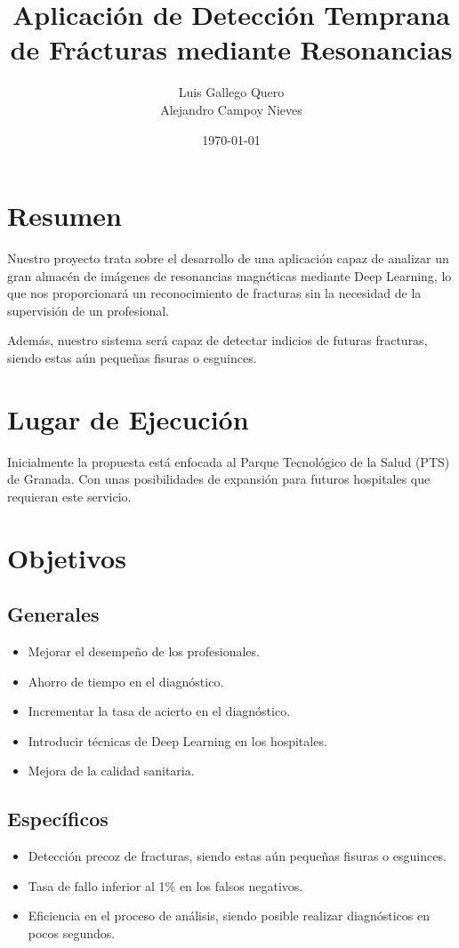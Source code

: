 \documentclass[a4paper,12pt,oneside]{article}
\title{Aplicación de Detección Temprana de Frácturas mediante Resonancias}
\author{Luis Gallego Quero \\ Alejandro Campoy Nieves}
\date{\today}
\begin{document}
\maketitle			
 
\section{Resumen}

Nuestro proyecto trata sobre el desarrollo de una aplicación capaz de analizar un gran almacén de imágenes de resonancias magnéticas mediante Deep Learning, lo que nos proporcionará un reconocimiento de fracturas sin la necesidad de la supervisión de un profesional. 

Además, nuestro sistema será capaz de detectar indicios de futuras fracturas, siendo estas aún pequeñas fisuras o esguinces.

\section{Lugar de Ejecución}

Inicialmente la propuesta está enfocada al Parque Tecnológico de la Salud (PTS) de Granada. Con unas posibilidades de expansión para futuros hospitales que requieran este servicio.

\section{Objetivos}
\subsection{Generales} 
\begin{itemize}
	\item Mejorar el desempeño de los profesionales.
	\item Ahorro de tiempo en el diagnóstico.
	\item Incrementar la tasa de acierto en el diagnóstico.
	\item Introducir técnicas de Deep Learning en los hospitales.
	\item Mejora de la calidad sanitaria.
\end{itemize}

\subsection{Específicos}
\begin{itemize}
	\item Detección precoz de fracturas, siendo estas aún pequeñas fisuras o esguinces.
	\item Tasa de fallo inferior al 1\% en los falsos negativos.
	\item Eficiencia en el proceso de análisis, siendo posible realizar diagnósticos en pocos segundos.
\end{itemize}
\end{document}

